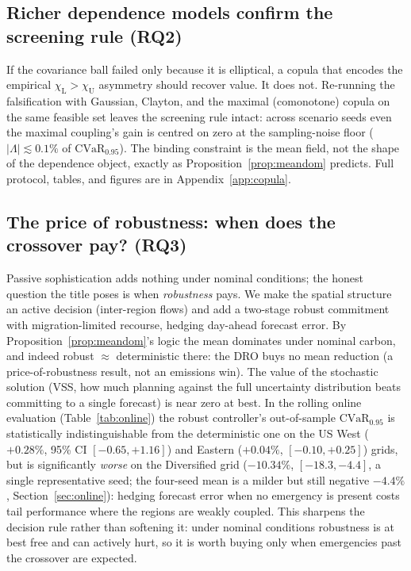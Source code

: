 \documentclass[12pt]{article}
\newcommand{\CVaR}{\mathrm{CVaR}}
\newcommand{\chiU}{\chi_{\mathrm{U}}}
\newcommand{\chiL}{\chi_{\mathrm{L}}}
\begin{document}
\subsection{Richer dependence models confirm the screening rule (RQ2)}\label{sec:res-copula}
If the covariance ball failed only because it is elliptical, a copula that encodes
the empirical $\chiL>\chiU$ asymmetry should recover value. It does not. Re-running
the falsification with Gaussian, Clayton, and the maximal (comonotone) copula on the
same feasible set leaves the screening rule intact: across scenario seeds even the
maximal coupling's gain is centred on zero at the sampling-noise floor
($|\Lambda|\lesssim0.1\%$ of $\CVaR_{0.95}$). The binding constraint is the mean
field, not the shape of the dependence object, exactly as
Proposition~\ref{prop:meandom} predicts. Full protocol, tables, and figures are in
Appendix~\ref{app:copula}.

\subsection{The price of robustness: when does the crossover pay?
(RQ3)}\label{sec:res-crossover}
Passive sophistication adds nothing under nominal conditions; the honest question the
title poses is when \emph{robustness} pays. We make the spatial structure an active
decision (inter-region flows) and add a two-stage robust commitment with
migration-limited recourse, hedging day-ahead forecast error. By
Proposition~\ref{prop:meandom}'s logic the mean dominates under nominal carbon, and
indeed robust $\approx$ deterministic there: the DRO buys no mean reduction (a
price-of-robustness result, not an emissions win). The value of the stochastic solution
(VSS, how much planning against the full uncertainty distribution beats committing to a
single forecast) is near zero at best. In the rolling online evaluation (Table~\ref{tab:online}) the
robust controller's out-of-sample $\CVaR_{0.95}$ is statistically indistinguishable from
the deterministic one on the US West ($+0.28\%$, 95\% CI $[-0.65,+1.16]$) and Eastern
($+0.04\%$, $[-0.10,+0.25]$) grids, but is significantly \emph{worse} on the Diversified
grid ($-10.34\%$, $[-18.3,-4.4]$, a single representative seed; the four-seed mean is a
milder but still negative $-4.4\%$, Section~\ref{sec:online}): hedging forecast error when
no emergency is present costs tail performance where the regions are weakly coupled. This sharpens the decision
rule rather than softening it: under nominal conditions robustness is at best free and
can actively hurt, so it is worth buying only when emergencies past the crossover are
expected.
\end{document}
